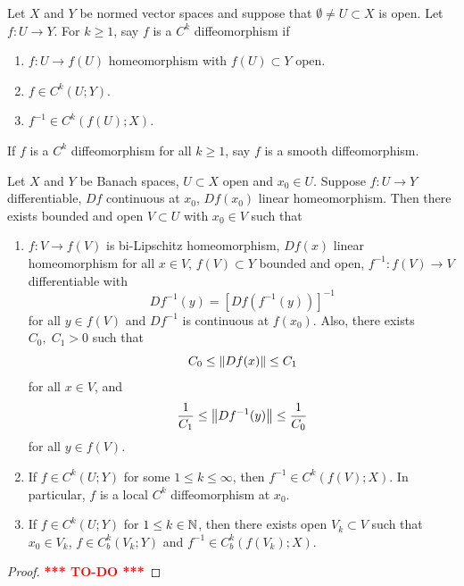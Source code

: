 \documentclass[a4paper]{article}
\newcommand{\TODO}{\textcolor{red}{\textbf{*** TO-DO ***}}}
\begin{document}
\begin{defi}[diffeomorphism]
Let $X$ and $Y$ be normed vector spaces and suppose that
$\emptyset \neq U \subset X$ is open.
Let $f : U \to Y$. For $k \geq 1$, say $f$ is a
$C^k$ diffeomorphism if
\begin{enumerate}
  \item $f: U \to f(U)$ homeomorphism with $f(U) \subset Y$
  open.
  \item $f \in C^k(U ; Y)$.
  \item $f^{-1} \in C^k(f(U); X)$.
\end{enumerate}
If $f$ is a $C^k$ diffeomorphism for all $k \geq 1$,
say $f$ is a smooth diffeomorphism.
\end{defi}

\begin{thm}
  Let $X$ and $Y$ be Banach spaces, $U \subset X$ open and
  $x_0 \in U$. Suppose $f: U \to Y$ differentiable,
  $Df$ continuous at $x_0$, $Df(x_0)$ linear homeomorphism.
  Then there exists bounded and open $V \subset U$ with
  $x_0 \in V$ such that
  \begin{enumerate}
    \item $f: V \to f(V)$ is bi-Lipschitz homeomorphism,
    $Df(x)$ linear homeomorphism for all $x \in V$,
    $f(V) \subset Y$ bounded and open, $f^{-1} : f(V) \to V$
    differentiable with
    \[
    Df^{-1}(y) = [Df(f^{-1}(y))]^{-1}
    \]
    for all $y \in f(V)$ and $Df^{-1}$ is continuous
    at $f(x_0)$. Also, there exists $C_0, \; C_1 > 0$
    such that
    \[
    C_0 \leq \left\lVert Df(x)\right\rVert \leq C_1
    \]
    for all $x \in V$, and
    \[
    \frac{1}{C_1} \leq \left\lVert Df^{-1}(y)\right\rVert \leq \frac{1}{C_0}
    \]
    for all $y \in f(V)$.
    \item If $f \in C^k(U; Y)$ for some $1 \leq k \leq \infty$,
    then $f^{-1} \in C^k(f(V); X)$. In particular,
    $f$ is a local $C^k$ diffeomorphism at $x_0$.
    \item If $f \in C^k(U; Y)$ for $1 \leq k \in \mathbb{N}$, then
    there exists open $V_k \subset V$ such that $x_0 \in V_k$,
    $f \in C^k_b(V_k ; Y)$ and $f^{-1} \in C^k_b(f(V_k) ; X)$.
  \end{enumerate}
\end{thm}

\begin{proof}
  \TODO
\end{proof}
\end{document}
